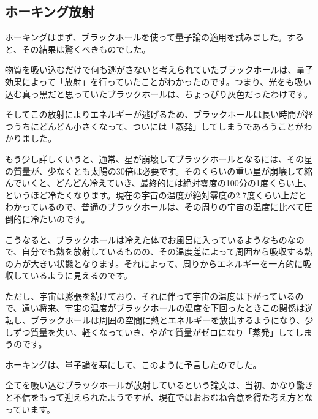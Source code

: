 \documentclass[10pt,b5paper,papersize,dvipdfmx]{jsbook}
\begin{document}
\subsection{ホーキング放射}
ホーキングはまず、ブラックホールを使って量子論の適用を試みました。すると、その結果は驚くべきものでした。\par
物質を吸い込むだけで何も逃がさないと考えられていたブラックホールは、量子効果によって「放射」を行っていたことがわかったのです。つまり、光をも吸い込む真っ黒だと思っていたブラックホールは、ちょっぴり灰色だったわけです。\par
そしてこの放射によりエネルギーが逃げるため、ブラックホールは長い時間が経つうちにどんどん小さくなって、ついには「蒸発」してしまうであろうことがわかりました。\par
もう少し詳しくいうと、通常、星が崩壊してブラックホールとなるには、その星の質量が、少なくとも太陽の30倍は必要です。そのくらいの重い星が崩壊して縮んでいくと、どんどん冷えていき、最終的には絶対零度の100分の1度くらい上、というほど冷たくなります。現在の宇宙の温度が絶対零度の2.7度くらい上だとわかっているので、普通のブラックホールは、その周りの宇宙の温度に比べて圧倒的に冷たいのです。\par
こうなると、ブラックホールは冷えた体でお風呂に入っているようなものなので、自分でも熱を放射しているものの、その温度差によって周囲から吸収する熱の方が大きい状態となります。それによって、周りからエネルギーを一方的に吸収しているように見えるのです。\par
ただし、宇宙は膨張を続けており、それに伴って宇宙の温度は下がっているので、遠い将来、宇宙の温度がブラックホールの温度を下回ったときこの関係は逆転し、ブラックホールは周囲の空間に熱とエネルギーを放出するようになり、少しずつ質量を失い、軽くなっていき、やがて質量がゼロになり「蒸発」してしまうのです。\par
ホーキングは、量子論を基にして、このように予言したのでした。\par
全てを吸い込むブラックホールが放射しているという論文は、当初、かなり驚きと不信をもって迎えられたようですが、現在ではおおむね合意を得た考え方となっています。
\end{document}
